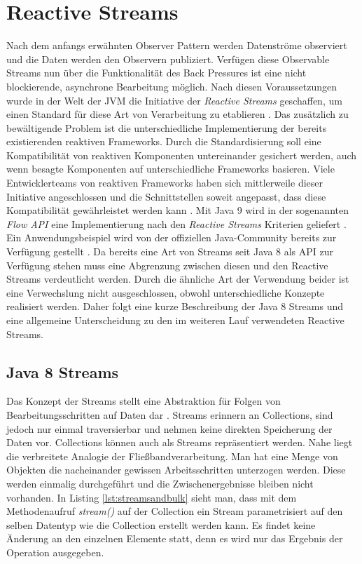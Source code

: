 \section{Reactive Streams}
Nach dem anfangs erwähnten Observer Pattern werden Datenströme observiert und die Daten werden den Observern publiziert. Verfügen diese Observable Streams nun über die Funktionalität des Back Pressures ist eine nicht blockierende, asynchrone Bearbeitung möglich. Nach diesen Voraussetzungen wurde in der Welt der JVM die Initiative der \textit{Reactive Streams} geschaffen, um einen Standard für diese Art von Verarbeitung zu etablieren \cite{rsmain}. Das zusätzlich zu bewältigende Problem ist die unterschiedliche Implementierung der bereits existierenden reaktiven Frameworks. Durch die Standardisierung soll eine Kompatibilität von reaktiven Komponenten untereinander gesichert werden, auch wenn besagte Komponenten auf unterschiedliche Frameworks basieren. Viele Entwicklerteams von reaktiven Frameworks haben sich mittlerweile dieser Initiative angeschlossen und die Schnittstellen soweit angepasst, dass diese Kompatibilität gewährleistet werden kann \cite{rslsting}. Mit Java 9 wird in der sogenannten \textit{Flow API} eine Implementierung nach den \textit{Reactive Streams} Kriterien geliefert \cite{flowdoc}. Ein Anwendungsbeispiel wird von der offiziellen Java-Community bereits zur Verfügung gestellt \cite{flowexmpl}. Da bereits eine Art von Streams seit Java 8 als API zur Verfügung stehen muss eine Abgrenzung zwischen diesen und den Reactive Streams verdeutlicht werden. Durch die ähnliche Art der Verwendung beider ist eine Verwechslung nicht ausgeschlossen, obwohl unterschiedliche Konzepte realisiert werden. Daher folgt eine kurze Beschreibung der Java 8 Streams und eine allgemeine Unterscheidung zu den im weiteren Lauf verwendeten Reactive Streams. 
\subsection{Java 8 Streams}
Das Konzept der Streams stellt eine Abstraktion für Folgen von Bearbeitungsschritten auf Daten dar \cite{Inden.2015}. Streams erinnern an Collections, sind jedoch nur einmal traversierbar und nehmen keine direkten Speicherung der Daten vor. Collections können auch als Streams repräsentiert werden. Nahe liegt die verbreitete Analogie der Fließbandverarbeitung. Man hat eine Menge von Objekten die nacheinander gewissen Arbeitsschritten unterzogen werden. Diese werden einmalig durchgeführt und die Zwischenergebnisse bleiben nicht vorhanden. In Listing \ref{lst:streamsandbulk} sieht man, dass mit dem Methodenaufruf \textit{stream()} auf der Collection ein Stream parametrisiert auf den selben Datentyp wie die Collection erstellt werden kann. Es findet keine Änderung an den einzelnen Elemente statt, denn es wird nur das Ergebnis der Operation ausgegeben.


